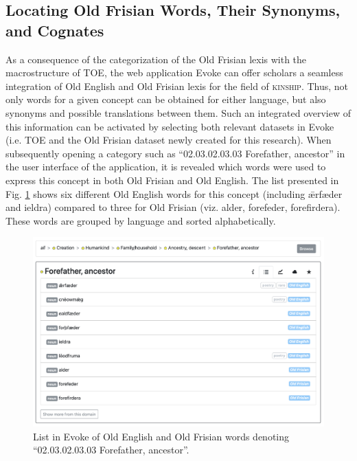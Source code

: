 \subsection{Locating Old Frisian Words, Their Synonyms, and Cognates}
As a consequence of the categorization of the Old Frisian lexis with the macrostructure of TOE, the web application Evoke can offer scholars a seamless integration of Old English and Old Frisian lexis for the field of \textsc{kinship}. Thus, not only words for a given concept can be obtained for either language, but also synonyms and possible translations between them. Such an integrated overview of this information can be activated by selecting both relevant datasets in Evoke (i.e. TOE and the Old Frisian dataset newly created for this research). When subsequently opening a category such as “02.03.02.03.03 Forefather, ancestor” in the user interface of the application,  it is revealed which words were used to express this concept in both Old Frisian and Old English. The list presented in Fig. \ref{fig:Stolk2021b:Fig2} shows six different Old English words for this concept (including ǣrfæder and ieldra) compared to three for Old Frisian (viz. alder, forefeder, forefirdera). These words are grouped by language and sorted alphabetically.
 
\begin{figure}[htbp]
	\includegraphics[width=\textwidth]{Stolk2021b/fig/Fig2.png}
	\caption[]{\label{fig:Stolk2021b:Fig2} List in Evoke of Old English and Old Frisian words denoting “02.03.02.03.03 Forefather, ancestor”.}
\end{figure}

